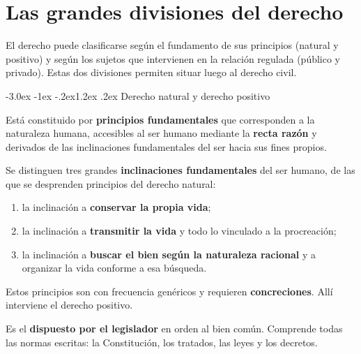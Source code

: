 \documentclass[12pt,oneside]{book}
\makeatletter
\renewcommand\section{\@startsection{section}{1}{\z@}%
  {-3.0ex \@plus -1ex \@minus -.2ex}{1.2ex \@plus .2ex}%
  {\normalfont\large\bfseries\color{acento}}}
\makeatother
\begin{document}

\chapter{Las grandes divisiones del derecho}
\label{cap:divisiones}

El derecho puede clasificarse según el fundamento de sus principios (natural y positivo) y según los sujetos que intervienen en la relación regulada (público y privado). Estas dos divisiones permiten situar luego al derecho civil.

\section{Derecho natural y derecho positivo}

\begin{definicion}
Está constituido por \textbf{principios fundamentales} que corresponden a la naturaleza humana, accesibles al ser humano mediante la \textbf{recta razón} y derivados de las inclinaciones fundamentales del ser hacia sus fines propios.
\end{definicion}

Se distinguen tres grandes \textbf{inclinaciones fundamentales} del ser humano, de las que se desprenden principios del derecho natural:

\begin{enumerate}
\item la inclinación a \textbf{conservar la propia vida};
\item la inclinación a \textbf{transmitir la vida} y todo lo vinculado a la procreación;
\item la inclinación a \textbf{buscar el bien según la naturaleza racional} y a organizar la vida conforme a esa búsqueda.
\end{enumerate}

Estos principios son con frecuencia genéricos y requieren \textbf{concreciones}. Allí interviene el derecho positivo.

\begin{definicion}
Es el \textbf{dispuesto por el legislador} en orden al bien común. Comprende todas las normas escritas: la Constitución, los tratados, las leyes y los decretos.
\end{definicion}
\end{document}
